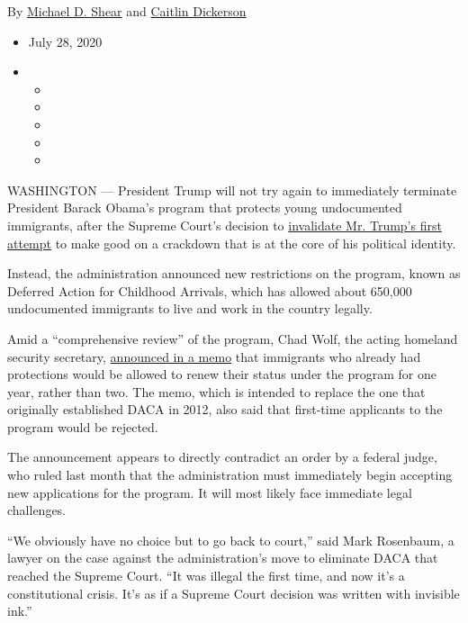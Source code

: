 By \href{https://www.nytimes.com/by/michael-d-shear}{Michael D. Shear}
and \href{https://www.nytimes.com/by/caitlin-dickerson}{Caitlin
Dickerson}

\begin{itemize}
\item
  July 28, 2020
\item
  \begin{itemize}
  \item
  \item
  \item
  \item
  \item
  \end{itemize}
\end{itemize}

WASHINGTON --- President Trump will not try again to immediately
terminate President Barack Obama's program that protects young
undocumented immigrants, after the Supreme Court's decision to
\href{https://www.nytimes.com/2020/06/18/us/trump-daca-supreme-court.html}{invalidate
Mr. Trump's first attempt} to make good on a crackdown that is at the
core of his political identity.

Instead, the administration announced new restrictions on the program,
known as Deferred Action for Childhood Arrivals, which has allowed about
650,000 undocumented immigrants to live and work in the country legally.

Amid a ``comprehensive review'' of the program, Chad Wolf, the acting
homeland security secretary,
\href{https://www.dhs.gov/sites/default/files/publications/20_0728_s1_daca-reconsideration-memo.pdf}{announced
in a memo} that immigrants who already had protections would be allowed
to renew their status under the program for one year, rather than two.
The memo, which is intended to replace the one that originally
established DACA in 2012, also said that first-time applicants to the
program would be rejected.

The announcement appears to directly contradict an order by a federal
judge, who ruled last month that the administration must immediately
begin accepting new applications for the program. It will most likely
face immediate legal challenges.

``We obviously have no choice but to go back to court,'' said Mark
Rosenbaum, a lawyer on the case against the administration's move to
eliminate DACA that reached the Supreme Court. ``It was illegal the
first time, and now it's a constitutional crisis. It's as if a Supreme
Court decision was written with invisible ink.''

